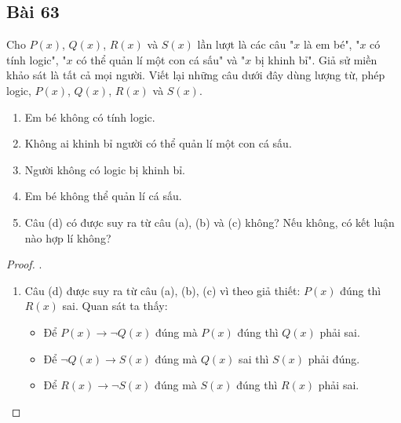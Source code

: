\subsection*{Bài 63}
Cho $P(x)$, $Q(x)$, $R(x)$ và $S(x)$ lần lượt là các câu "$x$ là em bé", "$x$ có tính logic", "$x$ có thể quản lí một con cá sấu" và "$x$ bị khinh bỉ". Giả sử miền khảo sát là tất cả mọi người. Viết lại những câu dưới đây dùng lượng từ, phép logic, $P(x)$, $Q(x)$, $R(x)$ và $S(x)$.
\begin{enumerate}[label=\alph*)]
    \item Em bé không có tính logic.
    \item Không ai khinh bỉ người có thể quản lí một con cá sấu.
    \item Người không có logic bị khinh bỉ.
    \item Em bé không thể quản lí cá sấu.
    \item Câu (d) có được suy ra từ câu (a), (b) và (c) không? Nếu không, có kết luận nào hợp lí không?
\end{enumerate}
\begin{proof}.
    \begin{enumerate}[label=\alph*)]
        \item Câu (d) được suy ra từ câu (a), (b), (c) vì theo giả thiết: $P(x)$ đúng thì $R(x)$ sai. Quan sát ta thấy:
        \begin{itemize}
            \item Để $P(x)\rightarrow \neg Q(x)$ đúng mà $P(x)$ đúng thì $Q(x)$ phải sai.
            \item Để $\neg Q(x)\rightarrow S(x)$ đúng mà $Q(x)$ sai thì $S(x)$ phải đúng.
            \item Để $R(x)\rightarrow \neg S(x)$ đúng mà $S(x)$ đúng thì $R(x)$ phải sai.
        \end{itemize}
    \end{enumerate}
\end{proof}
